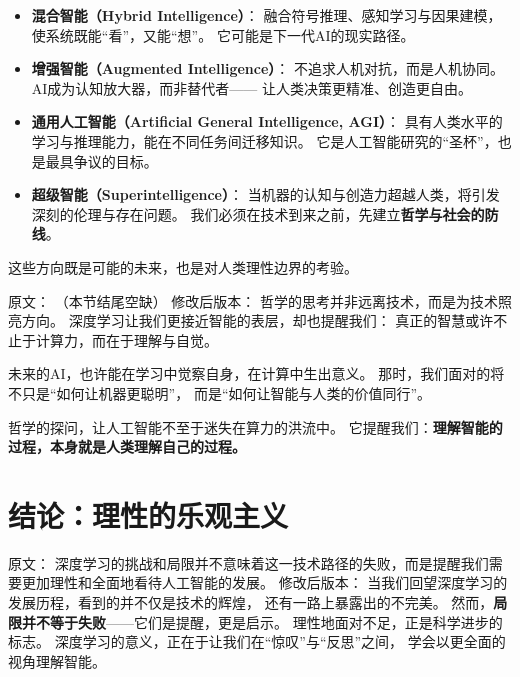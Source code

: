 \begin{itemize}
\item \textbf{混合智能（Hybrid Intelligence）}：  
  融合符号推理、感知学习与因果建模，使系统既能“看”，又能“想”。  
  它可能是下一代AI的现实路径。  

\item \textbf{增强智能（Augmented Intelligence）}：  
  不追求人机对抗，而是人机协同。  
  AI成为认知放大器，而非替代者——  
  让人类决策更精准、创造更自由。  

\item \textbf{通用人工智能（Artificial General Intelligence, AGI）}：  
  具有人类水平的学习与推理能力，能在不同任务间迁移知识。  
  它是人工智能研究的“圣杯”，也是最具争议的目标。  

\item \textbf{超级智能（Superintelligence）}：  
  当机器的认知与创造力超越人类，将引发深刻的伦理与存在问题。  
  我们必须在技术到来之前，先建立\textbf{哲学与社会的防线}。  
\end{itemize}
这些方向既是可能的未来，也是对人类理性边界的考验。



原文：
（本节结尾空缺）
修改后版本：
哲学的思考并非远离技术，而是为技术照亮方向。  
深度学习让我们更接近智能的表层，却也提醒我们：  
真正的智慧或许不止于计算力，而在于理解与自觉。  

未来的AI，也许能在学习中觉察自身，在计算中生出意义。  
那时，我们面对的将不只是“如何让机器更聪明”，  
而是“如何让智能与人类的价值同行”。  

哲学的探问，让人工智能不至于迷失在算力的洪流中。  
它提醒我们：\textbf{理解智能的过程，本身就是人类理解自己的过程。}


\section{结论：理性的乐观主义}

原文：
深度学习的挑战和局限并不意味着这一技术路径的失败，而是提醒我们需要更加理性和全面地看待人工智能的发展。
修改后版本：
当我们回望深度学习的发展历程，看到的并不仅是技术的辉煌，  
还有一路上暴露出的不完美。  
然而，\textbf{局限并不等于失败}——它们是提醒，更是启示。  
理性地面对不足，正是科学进步的标志。  
深度学习的意义，正在于让我们在“惊叹”与“反思”之间，  
学会以更全面的视角理解智能。



